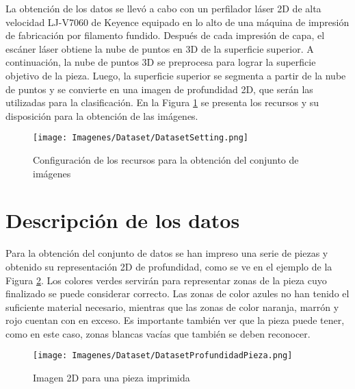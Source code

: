 \documentclass{report}
\begin{document}
La obtención de los datos se llevó a cabo con un perfilador láser 2D de alta velocidad LJ-V7060 de Keyence equipado en lo alto de una máquina de impresión de fabricación por filamento fundido. Después de cada impresión de capa, el escáner láser obtiene la nube de puntos en 3D de la superficie superior. A continuación, la nube de puntos 3D se preprocesa para lograr la superficie objetivo de la pieza. Luego, la superficie superior se segmenta a partir de la nube de puntos y se convierte en una imagen de profundidad 2D, que serán las utilizadas para la clasificación. En la Figura \ref{fig:DatasetSetup} se presenta los recursos y su disposición para la obtención de las imágenes.



\vspace{0.4cm}
\begin{figure}[H]
    \centering
    \texttt{[image: Imagenes/Dataset/DatasetSetting.png]}
    \caption{ Configuración de los recursos para la obtención del conjunto de imágenes \cite{AMDataset} }
    \label{fig:DatasetSetup}
\end{figure}
\vspace{0.4cm}



\section{Descripción de los datos}


Para la obtención del conjunto de datos se han impreso una serie de piezas y obtenido su representación 2D de profundidad, como se ve en el ejemplo de la Figura \ref{fig:DatasetPieza}. Los colores verdes servirán para representar zonas de la pieza cuyo finalizado se puede considerar correcto. Las zonas de color azules no han tenido el suficiente material necesario, mientras que las zonas de color naranja, marrón y rojo cuentan con en exceso. Es importante también ver que la pieza puede tener, como en este caso, zonas blancas vacías que también se deben reconocer.



\vspace{0.4cm}
\begin{figure}[H]
    \centering
    \texttt{[image: Imagenes/Dataset/DatasetProfundidadPieza.png]}
    \caption{ Imagen 2D para una pieza imprimida \cite{AMDataset} }
    \label{fig:DatasetPieza}
\end{figure}
\vspace{0.4cm}
\end{document}
